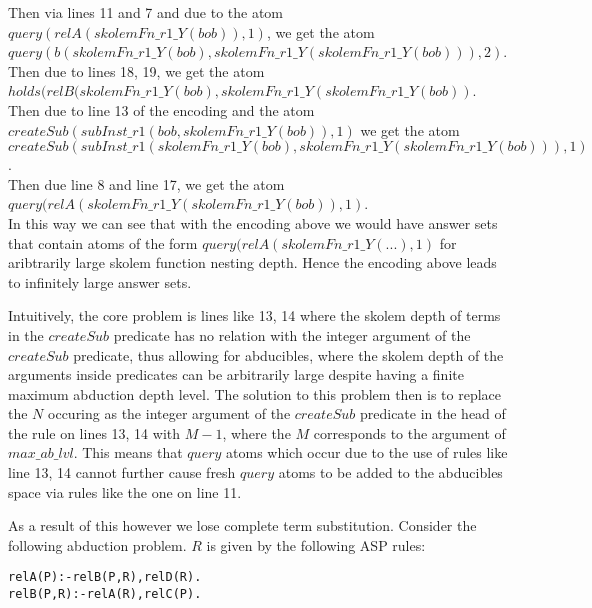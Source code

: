 \documentclass[sigconf]{acmart}
\begin{document}
Then via lines 11 and 7 and due to the atom $query(relA(skolemFn\_r1\_Y(bob)),1)$, we get the atom $query(b(skolemFn\_r1\_Y(bob), skolemFn\_r1\_Y(skolemFn\_r1\_Y(bob))),2)$. \\

Then due to lines 18, 19, we get the atom $holds(relB(skolemFn\_r1\_Y(bob), skolemFn\_r1\_Y(skolemFn\_r1\_Y(bob))$.\\

Then due to line 13 of the encoding and the atom $createSub(subInst\_r1(bob,skolemFn\_r1\_Y(bob)),1)$ we get the atom $createSub(subInst\_r1(skolemFn\_r1\_Y(bob), skolemFn\_r1\_Y(skolemFn\_r1\_Y(bob))),1)$. \\

Then due line 8 and line 17, we get the atom $query(relA(skolemFn\_r1\_Y(skolemFn\_r1\_Y(bob)),1)$.\\

In this way we can see that with the encoding above we would have answer sets
that contain atoms of the form $query(relA(skolemFn\_r1\_Y(...),1)$ for
aribtrarily large skolem function nesting depth. Hence the encoding above
leads to infinitely large answer sets.

Intuitively, the core problem is lines like 13, 14 where the skolem depth of
terms in the $createSub$ predicate has no relation with the integer argument
of the $createSub$ predicate, thus allowing for abducibles, where the skolem
depth of the arguments inside predicates can be arbitrarily large despite
having a finite maximum abduction depth level. The solution to this problem
then is to replace the $N$ occuring as the integer argument of the $createSub$
predicate in the head of the rule on lines 13, 14 with $M-1$, where the $M$
corresponds to the argument of $max\_ab\_lvl$. This means that $query$ atoms
which occur due to the use of rules like line 13, 14 cannot further cause
fresh $query$ atoms to be added to the abducibles space via rules like the one
on line 11.

As a result of this however we lose complete term substitution. Consider the following abduction problem. $R$ is given by the following ASP rules:
\begin{verbatim}
relA(P):-relB(P,R),relD(R).
relB(P,R):-relA(R),relC(P).
\end{verbatim}
\end{document}
